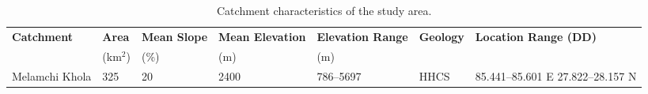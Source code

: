 








\begin{table}[h!]
\centering
\begin{small}
\begin{tabular}{p{3cm} p{1cm} p{1cm} p{1.8cm} p{1.9cm} p{1.5cm} p{3cm}}
       \hline
       \textbf{Catchment} & \textbf{Area} & \textbf{Mean Slope} & \textbf{Mean Elevation} & \textbf{Elevation Range} & \textbf{Geology} & \textbf{Location Range (DD)} \\[4pt]
                          & (km$^2$)    & (\%)                & (m)                     & (m)                      &                &  \\[4pt]
       \hline
       Melamchi Khola     & 325         & 20                  & 2400                    & 786--5697                & HHCS           & 85.441--85.601 E  27.822--28.157 N \\[4pt]
       \hline
\end{tabular}
\end{small}
\caption{Catchment characteristics of the study area.}
\label{tab:catchment_characteristics}
\end{table}



